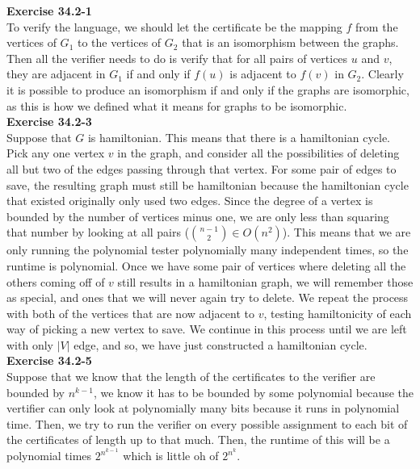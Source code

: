 \documentclass{article}
\begin{document}
\noindent\textbf{Exercise 34.2-1}\\

To verify the language, we should let the certificate be the mapping $f$ from the vertices of $G_1$ to the vertices of $G_2$ that is an isomorphism between the graphs. Then all the verifier needs to do is verify that for all pairs of vertices $u$ and $v$, they are adjacent in $G_1$ if and only if $f(u)$ is adjacent to $f(v)$ in $G_2$. Clearly it is possible to produce an isomorphism if and only if the graphs are isomorphic, as this is how we defined what it means for graphs to be isomorphic.\\



\noindent\textbf{Exercise 34.2-3}\\

Suppose that $G$ is hamiltonian. This means that there is a hamiltonian cycle. Pick any one vertex $v$ in the graph, and consider all the possibilities of deleting all but two of the edges passing through that vertex. For some pair of edges to save, the resulting graph must still be hamiltonian because the hamiltonian cycle that existed originally only used two edges. Since the degree of a vertex is bounded by the number of vertices minus one, we are only less than squaring that number by looking at all pairs ($\binom{n-1}{2} \in O(n^2)$). This means that we are only running the polynomial tester polynomially many independent times, so the runtime is polynomial. Once we have some pair of vertices where deleting all the others coming off of $v$ still results in a hamiltonian graph, we will remember those as special, and ones that we will never again try to delete. We repeat the process with both of the vertices that are now adjacent to $v$, testing hamiltonicity of each way of picking a new vertex to save. We continue in this process until we are left with only $|V|$ edge, and so, we have just constructed a hamiltonian cycle.\\ 



\noindent\textbf{Exercise 34.2-5}\\

Suppose that we know that the length of the certificates to the verifier are bounded by $n^{k-1}$, we know it has to be bounded by some polynomial because the vertifier can only look at polynomially many bits because it runs in polynomial time. Then, we try to run the verifier on every possible assignment to each bit of the certificates of length up to that much. Then, the runtime of this will be a polynomial times $2^{n^{k-1}}$ which is little oh of $2^{n^k}$.\\
\end{document}

